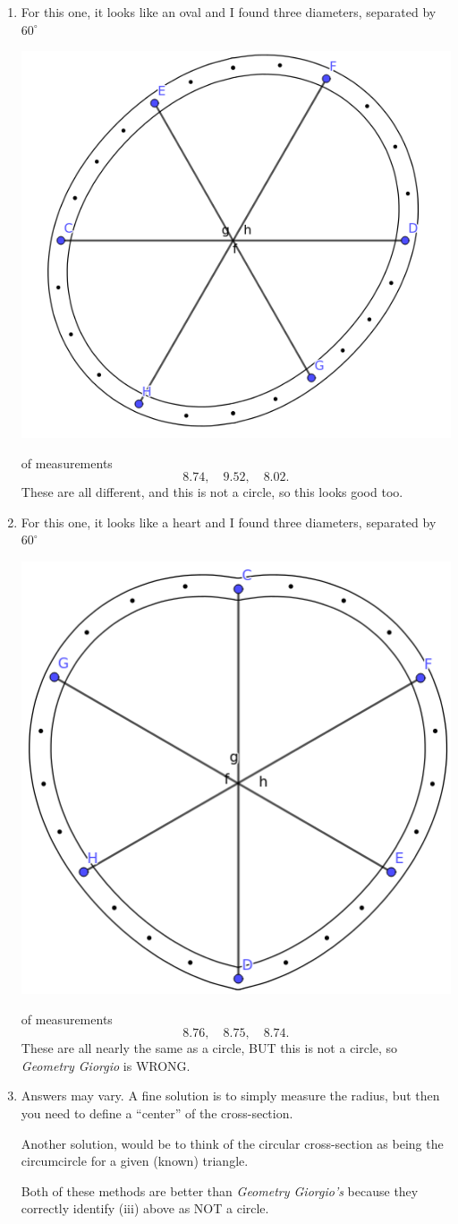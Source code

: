 \documentclass[nooutcomes,noauthor,hints,handout]{ximera}
\begin{document}
\begin{question}
\begin{freeResponse}
\begin{enumerate}
\begin{enumerate}
      \item For this one, it looks like an oval and I found three
        diameters, separated by $60^\circ$
        \begin{center}
          \includegraphics[width=.4\textwidth]{ovalGGMeasured.png}
        \end{center}
        of measurements
        \[
        8.74,\quad 9.52,\quad 8.02.
        \]
        These are all different, and this is not a circle, so this
        looks good too.

      \item For this one, it looks like a heart and I found three
        diameters, separated by $60^\circ$
        \begin{center}
          \includegraphics[width=.4\textwidth]{heartGGMeasured.png}
        \end{center}
        of measurements
        \[
        8.76,\quad 8.75,\quad 8.74.
        \]
        These are all nearly the same as a circle, BUT this is not a
        circle, so \textit{Geometry Giorgio} is WRONG.

      \item Answers may vary. A fine solution is to simply measure the
        radius, but then you need to define a ``center'' of the
        cross-section.

        Another solution, would be to think of the circular
        cross-section as being the circumcircle for a given (known)
        triangle.

        Both of these methods are better than \textit{Geometry
          Giorgio's} because they correctly identify (iii) above as
        NOT a circle.
        
      \end{enumerate}

    \end{enumerate}
  \end{freeResponse}
\end{question}
\end{document}
